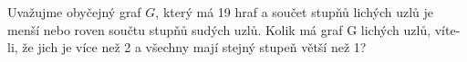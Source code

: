 Uvažujme obyčejný graf $G$, který má 19 hraf a součet stupňů lichých uzlů je
menší nebo roven součtu stupňů sudých uzlů. Kolik má graf G lichých uzlů,
víte-li, že jich je více než 2 a všechny mají stejný stupeň větší než 1?
